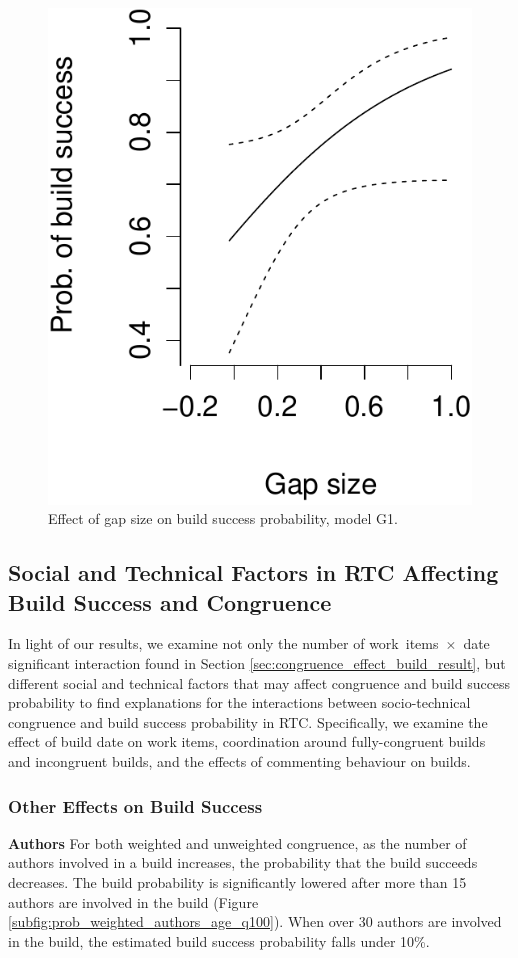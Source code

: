 \begin{figure}[t]
	\centering
	\includegraphics[width=.5\columnwidth]{figures/prob_gapsize_g1}
	\caption{Effect of gap size on build success probability, model G1. }
	\label{fig:prob_gapsize_a}
\end{figure}




\subsection{Social and Technical Factors in RTC Affecting Build Success and Congruence}
\label{sec:otherfactors}
In light of our results, we examine not only the number of work~items~$\times$~date significant interaction found in Section \ref{sec:congruence_effect_build_result}, but different social and technical factors that may affect congruence
and build success probability to find explanations for the interactions between socio-technical congruence and build success probability in RTC.
Specifically, we examine the effect of build date on work items, coordination around fully-congruent builds and
incongruent builds, and the effects of commenting behaviour on builds.

\subsubsection{Other Effects on Build Success}
\label{sec:effectauthors}
\textbf{Authors} For both weighted and unweighted congruence, as the number of authors involved in a build increases, the probability that the build succeeds decreases. The build probability is significantly lowered after more than 15 authors are involved in the build (Figure \ref{subfig:prob_weighted_authors_age_q100}). When over 30 authors are involved in the build, the estimated build success probability falls under 10\%.

